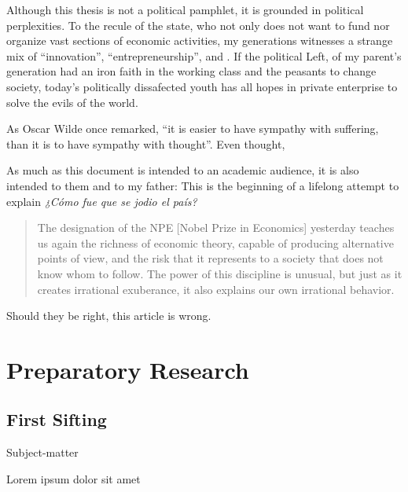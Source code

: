 \documentclass[paper=B6,portrait,twoside=true,twocolumn=false,headinclude=true,footinclude=false,fontsize=12,BCOR=10mm,DIV=calc,pagesize=auto,titlepage=firstiscover,mpinclude=false,headings=normal,headings=twolinechapter,open=right,toc=graduated,chapterprefix=false,numbers=endperiod,parskip=half+]{scrbook}
\theoremstyle{definition}
\begin{document}
Although this thesis is not a political pamphlet, it is grounded in
political perplexities. To the recule of the state, who not only does not
want to fund nor organize vast sections of economic activities, my
generations witnesses a strange mix of ``innovation'',
``entrepreneurship'', and . If the political Left, of my parent's
generation had an iron faith in the working class and the peasants to
change society, today's politically dissafected youth has all hopes in
private enterprise to solve the evils of the world.

As Oscar Wilde once remarked, ``it is easier to have sympathy with
suffering, than it is to have sympathy with thought''. Even thought,

As much as this document is intended to an academic audience, it is also
intended to them and to my father: This is the beginning of a lifelong
attempt to explain \emph{¿Cómo fue que se jodio el país?} 

\blockcquote{Alvarez2013}{The designation of the NPE [Nobel Prize in Economics] yesterday teaches us again the richness of economic theory, capable of producing  alternative points of view, and the risk that it represents to a society that does not know whom to follow. The power of this discipline is unusual, but just as it creates irrational exuberance, it also explains our own irrational behavior.}

Should they be right, this article is wrong. 

\mainmatter
\pagestyle{scrheadings}
\part{Preparatory Research}
\label{sec:orge00ae3f}
\chapter{First Sifting}
\label{sec:orgd7a8318}
   \begin{labeling}[~]{Subject-matter} 
\item[Subject-matter] Lorem ipsum dolor sit amet
\end{labeling}
\end{document}

